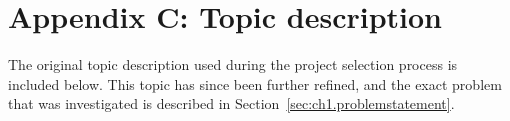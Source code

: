 %
%
%

\chapter*{Appendix C: Topic description}
The original topic description used during the project selection process is
included below. This topic has since been further refined, and the exact
problem that was investigated is described in
Section~\ref{sec:ch1.problemstatement}.

%


